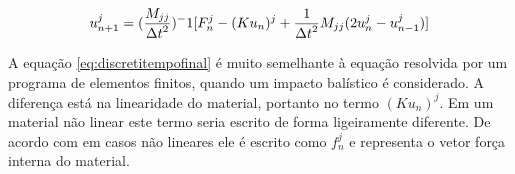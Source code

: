 \begin{equation} \label{eq:discretitempofinal}
    u^j_{n+1} = (\frac{\displaystyle M_{jj}}{\displaystyle \Delta t^2} )^-1 [F_n^j - (Ku_n)^j + \frac{\displaystyle 1}{\displaystyle \Delta t^2}M_{jj}(2u_n^j - u_{n-1}^j)]
\end{equation}


A equação \ref{eq:discretitempofinal} é muito semelhante à equação resolvida por um programa de elementos finitos, quando um impacto balístico é considerado. A diferença está na linearidade do material, portanto no termo $(Ku_n)^j$. Em um material não linear este termo seria escrito de forma ligeiramente diferente. De acordo com \cite{Paulo} em casos não lineares ele é escrito como $f^j_n$ e representa o vetor força interna do material. \\
